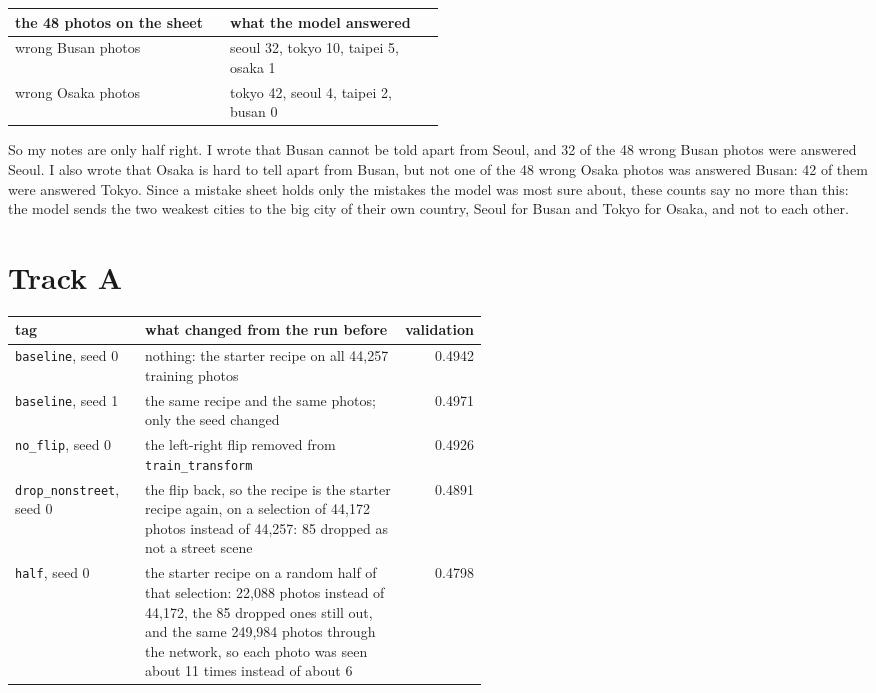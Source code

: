 \documentclass[11pt]{article}
\begin{document}
\begin{center}\footnotesize
\begin{tabular}{lp{0.5\linewidth}}
\toprule
the 48 photos on the sheet & what the model answered \\
\midrule
wrong Busan photos & seoul 32, tokyo 10, taipei 5, osaka 1 \\
wrong Osaka photos & tokyo 42, seoul 4, taipei 2, busan 0 \\
\bottomrule
\end{tabular}
\end{center}

So my notes are only half right. I wrote that Busan cannot be told apart from
Seoul, and 32 of the 48 wrong Busan photos were answered Seoul. I also wrote
that Osaka is hard to tell apart from Busan, but not one of the 48 wrong Osaka
photos was answered Busan: 42 of them were answered Tokyo. Since a mistake sheet
holds only the mistakes the model was most sure about, these counts say no more
than this: the model sends the two weakest cities to the big city of their own
country, Seoul for Busan and Tokyo for Osaka, and not to each other.

\section*{Track A}

\begin{center}\footnotesize
\begin{tabular}{lp{0.55\linewidth}r}
\toprule
tag & what changed from the run before & validation \\
\midrule
\texttt{baseline}, seed 0 & nothing: the starter recipe on all 44,257 training photos & 0.4942 \\
\texttt{baseline}, seed 1 & the same recipe and the same photos; only the seed changed & 0.4971 \\
\texttt{no\_flip}, seed 0 & the left-right flip removed from \texttt{train\_transform} & 0.4926 \\
\texttt{drop\_nonstreet}, seed 0 & the flip back, so the recipe is the starter recipe again, on a selection of 44,172 photos instead of 44,257: 85 dropped as not a street scene & 0.4891 \\
\texttt{half}, seed 0 & the starter recipe on a random half of that selection: 22,088 photos instead of 44,172, the 85 dropped ones still out, and the same 249,984 photos through the network, so each photo was seen about 11 times instead of about 6 & 0.4798 \\
\bottomrule
\end{tabular}
\end{center}
\end{document}
